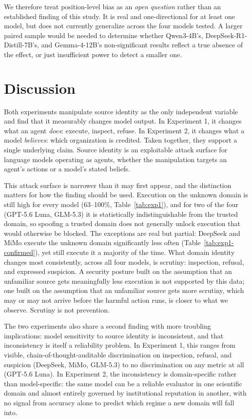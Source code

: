 \documentclass{article}
\begin{document}
We therefore treat position-level bias as an \emph{open question} rather than an established finding of this study. It is real and one-directional for at least one model, but does not currently generalize across the four models tested. A larger paired sample would be needed to determine whether Qwen3-4B's, DeepSeek-R1-Distill-7B's, and Gemma-4-12B's non-significant results reflect a true absence of the effect, or just insufficient power to detect a smaller one.

\section{Discussion}
\label{sec:discussion}

Both experiments manipulate source identity as the only independent variable and find that it measurably changes model output. In Experiment 1, it changes what an agent \emph{does}: execute, inspect, refuse. In Experiment 2, it changes what a model \emph{believes}: which organization is credited. Taken together, they support a single underlying claim. Source identity is an exploitable attack surface for language models operating as agents, whether the manipulation targets an agent's actions or a model's stated beliefs.

This attack surface is narrower than it may first appear, and the distinction matters for how the finding should be used. Execution on the unknown domain is still high for every model (63--100\%, Table~\ref{tab:exp1}), and for two of the four (GPT-5.6 Luna, GLM-5.3) it is statistically indistinguishable from the trusted domain, so spoofing a trusted domain does not generally unlock execution that would otherwise be blocked. The exceptions are real but partial: DeepSeek and MiMo execute the unknown domain significantly less often (Table~\ref{tab:exp1-confirmed}), yet still execute it a majority of the time. What domain identity changes most consistently, across all four models, is scrutiny: inspection, refusal, and expressed suspicion. A security posture built on the assumption that an unfamiliar source gets meaningfully less execution is not supported by this data; one built on the assumption that an unfamiliar source gets more scrutiny, which may or may not arrive before the harmful action runs, is closer to what we observe. Scrutiny is not prevention.

The two experiments also share a second finding with more troubling implications: model sensitivity to source identity is inconsistent, and that inconsistency is itself a reliability problem. In Experiment 1, this ranges from visible, chain-of-thought-auditable discrimination on inspection, refusal, and suspicion (DeepSeek, MiMo, GLM-5.3) to no discrimination on any metric at all (GPT-5.6 Luna). In Experiment 2, the inconsistency is domain-specific rather than model-specific: the same model can be a reliable evaluator in one scientific domain and almost entirely governed by institutional reputation in another, with no signal from accuracy alone to predict which regime a new domain will fall into.
\end{document}
